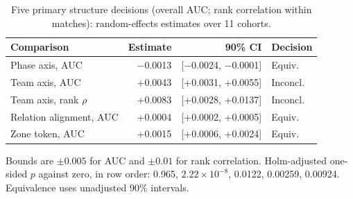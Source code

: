 \begin{table}[t]
\centering\footnotesize
\caption{Five primary structure decisions (overall AUC; rank correlation within matches): random-effects estimates over 11 cohorts.}
\label{tab:primary}
\setlength{\tabcolsep}{2.5pt}
\begin{tabular}{lrrl}
\toprule
Comparison & Estimate & 90\% CI & Decision \\
\midrule
Phase axis, AUC & $-$0.0013 & [$-$0.0024, $-$0.0001] & Equiv. \\
Team axis, AUC & +0.0043 & [+0.0031, +0.0055] & Inconcl. \\
Team axis, rank $\rho$ & +0.0083 & [+0.0028, +0.0137] & Inconcl. \\
Relation alignment, AUC & +0.0004 & [+0.0002, +0.0005] & Equiv. \\
Zone token, AUC & +0.0015 & [+0.0006, +0.0024] & Equiv. \\
\bottomrule
\end{tabular}
\smallskip
\parbox{\columnwidth}{\scriptsize Bounds are $\pm0.005$ for AUC and $\pm0.01$ for rank correlation. Holm-adjusted one-sided $p$ against zero, in row order: 0.965, $2.22\times10^{-8}$, 0.0122, 0.00259, 0.00924. Equivalence uses unadjusted 90\% intervals.}
\end{table}
